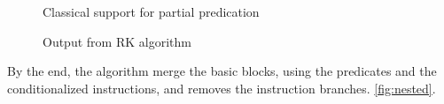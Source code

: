\begin{figure}
{    \label{fig:nested2}}
\caption{Classical support for partial predication}
\label{fig:trad_part_pred}
\end{figure}

\begin{figure}
\footnotesize
\caption{Output from RK algorithm}
\label{fig:RK}
\end{figure}

By the end, the algorithm merge the basic blocks, using the predicates and the conditionalized instructions, and removes the instruction branches. \ref{fig:nested}. 

